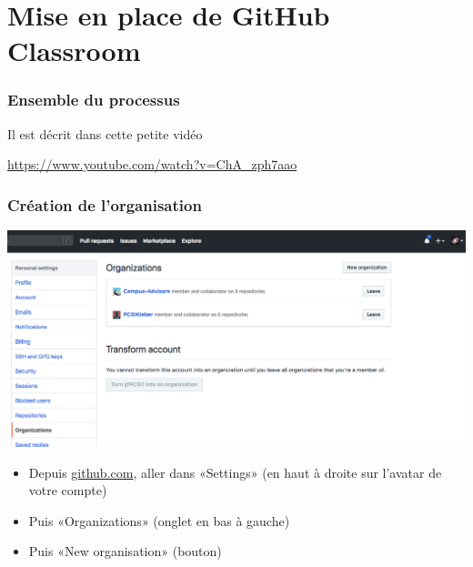 \section{Mise en place de GitHub Classroom}


\begin{frame}
	\frametitle{Ensemble du processus}

	Il est décrit dans cette petite vidéo

	\begin{center}
		\url{https://www.youtube.com/watch?v=ChA_zph7aao}
	\end{center}


\end{frame}



\begin{frame}
	\frametitle{Création de l'organisation}

	\begin{center}
		\includegraphics[width=0.8\linewidth]{figures/classroom_organization.png}
	\end{center}

	\begin{itemize}[<+->]
		\item	Depuis \url{github.com}, aller dans «Settings» (en haut à droite sur l'avatar de votre compte)

		\item Puis «Organizations» (onglet en bas à gauche)

		\item Puis «New organisation» (bouton)

	\end{itemize}

\end{frame}


